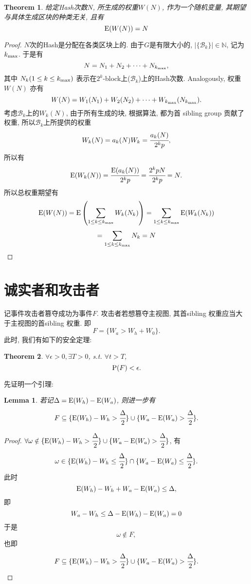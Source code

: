 \documentclass[UTF8]{ctexart}
\theoremstyle{definition}
\theoremstyle{plain}
\newtheorem{theorem}{Theorem}
\newtheorem{lemma}{Lemma}
\begin{document}
\begin{theorem}
    给定Hash次数$N$, 所生成的权重$W(N)$, 作为一个随机变量, 其期望与具体生成区块的种类无关, 且有
    \[ {\rm {E}}(W(N)) = N \]
    \label{weight}
\end{theorem}
\begin{proof}
    $N$次的Hash是分配在各类区块上的. 由于$G$是有限大小的, $|\{\mathcal{B}_k\}|\in \mathbb{N}$, 记为$k_{\rm max}$.
    于是有
    \[N = N_1 + N_2 + \dots + N_{k_{\rm max}},\] 其中 $N_k (1 \le k \le k_{\rm max})$ 表示在$2^k$-block上($\mathcal{B}_k$)上的Hash次数.
    Analogously, 权重$W(N)$ 亦有
    \[W(N) = W_1(N_1) + W_2(N_2) + \dots + W_{k_{\rm max}}(N_{k_{\rm max}}).\]
    考虑$\mathcal{B}_k$上的$W_k(N)$, 由于所有生成的块, 根据算法, 都为首 sibling group 贡献了权重, 所以$\mathcal{B}_k$上所提供的权重
    \[W_k(N) = a_k(N)W_k = \cfrac{a_k(N)}{2^k p},\]所以有
    \[{\rm E}(W_k(N))=\cfrac{{\rm E}(a_k(N))}{2^k p} = \cfrac{2^k p N}{2^k p} = N.\]
    所以总权重期望有
    \[ {\rm {E}}(W(N)) ={\rm {E}}\left(\sum_{1 \le k \le k_{\rm max}} W_k(N_k)\right) =\sum_{1 \le k \le k_{\rm max}} {\rm {E}}(W_k(N_k))\]
    \[= \sum_{1 \le k \le k_{\rm max}}N_k = N\]
\end{proof}

\section{诚实者和攻击者}
记事件攻击者篡夺成功为事件$F$. 攻击者若想篡夺主视图, 其首sibling 权重应当大于主视图的首sibling 权重. 
即\[F=\{W_a>W_h+W_0\}.\]
此时, 我们有如下的安全定理:
\begin{theorem}
    $\forall \epsilon>0, \exists T>0$, s.t. $\forall t>T$,
    \[{\rm P}(F) <\epsilon .\]
    \label{safethm}
\end{theorem}
先证明一个引理:
\begin{lemma}
    若记$\Delta = {\rm E}(W_h)-{\rm E}(W_a)$, 则进一步有
\[F\subseteq \{{\rm E}(W_h)-W_h>\cfrac{\Delta}{2}\} \cup \{W_a-{\rm E}(W_a)>\cfrac{\Delta}{2}\}.\]
\label{lem}
\end{lemma}

\begin{proof}
$\forall\omega\notin\{{\rm E}(W_h)-W_h>\cfrac{\Delta}{2}\} \cup \{W_a-{\rm E}(W_a)>\cfrac{\Delta}{2}\}$, 有
\[\omega\in \{{\rm E}(W_h)-W_h\le\cfrac{\Delta}{2}\} \cap \{W_a-{\rm E}(W_a)\le\cfrac{\Delta}{2}\}.\] 此时
\[{\rm E}(W_h)-W_h+W_a-{\rm E}(W_a)\le\Delta,\]即
\[W_a-W_h \le \Delta - {\rm E}(W_h)-{\rm E}(W_a)= 0 \]
于是\[\omega \notin F,\] 也即\[F \subseteq \{{\rm E}(W_h)-W_h>\cfrac{\Delta}{2}\} \cup \{W_a-{\rm E}(W_a)>\cfrac{\Delta}{2}\}.\]
\end{proof}
\end{document}
